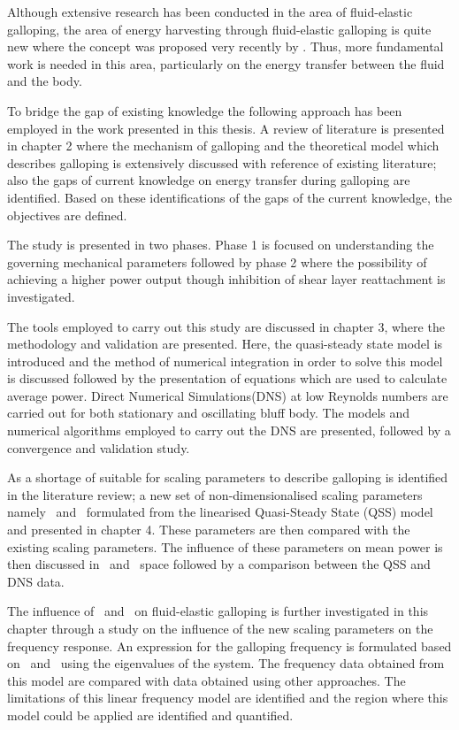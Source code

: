 Although extensive research has been conducted in the area of fluid-elastic galloping, the area of energy harvesting through fluid-elastic galloping is quite new where the concept was proposed very recently by \citet{Barrero-Gil2010a}. Thus, more fundamental work is needed in this area, particularly on the energy transfer between the fluid and the body.   
 
To bridge the gap of existing knowledge the following approach has been employed in the work presented in this thesis. A review of literature is presented in chapter 2 where the mechanism of galloping and the theoretical model which describes galloping is extensively discussed with reference of existing literature; also the  gaps of current knowledge on energy transfer during galloping are identified. Based on these identifications of the gaps of the current knowledge, the objectives are defined.

The study is presented in two phases. Phase 1 is focused on understanding the governing mechanical parameters followed by phase 2 where the possibility of achieving a higher power output though inhibition of shear layer reattachment is investigated.  

The tools employed to carry out this study are discussed in chapter 3, where the methodology and validation are presented. Here, the quasi-steady state model is introduced and the method of numerical integration in order to solve this model is discussed followed by the presentation of equations which are used to calculate average power. Direct Numerical Simulations(DNS) at low Reynolds numbers are carried out for both stationary and  oscillating bluff body. The models and numerical algorithms employed to carry out the DNS are presented, followed by a convergence and validation study.  

As a shortage of suitable for scaling parameters to describe galloping is identified in the literature review; a new set of non-dimensionalised scaling parameters namely \massstiff\ and \massdamp\ formulated from the linearised Quasi-Steady State (QSS) model and presented in chapter 4. These parameters are then compared with the existing scaling parameters. The influence of these parameters on mean power is then discussed in \massstiff\ and \massdamp\ space followed by a comparison between the QSS and DNS data.

The influence of \massstiff\ and \massdamp\ on fluid-elastic galloping is further investigated in this chapter through a study on the influence of the new scaling parameters on the frequency response. An expression for the galloping frequency is formulated based on \massstiff\ and \massdamp\ using the eigenvalues of the system. The frequency data obtained from this model are compared with data obtained using other approaches. The limitations of this linear frequency model are identified and the region where this model could be applied are identified and quantified.

